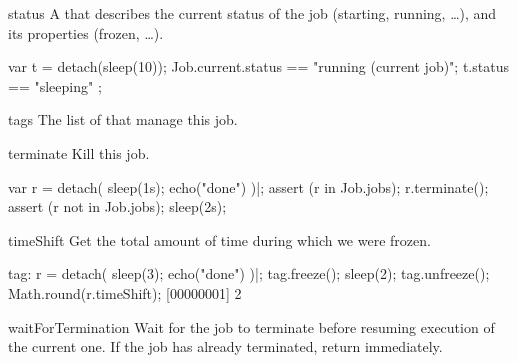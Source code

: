\begin{urbiscriptapi}
\item[status] A  that describes the current status of the
  job (starting, running, \ldots), and its properties (frozen, \ldots).
\begin{urbiassert}
var t = detach(sleep(10));
Job.current.status == "running (current job)";
t.status == "sleeping" ;
\end{urbiassert}


\item[tags] The list of  that manage this job.


\item[terminate]  Kill this job.
\begin{urbiscript}
var r = detach({ sleep(1s); echo("done") })|;
assert (r in Job.jobs);
r.terminate();
assert (r not in Job.jobs);
sleep(2s);
\end{urbiscript}


\item[timeShift]
  Get the total amount of time during which we were frozen.
\begin{urbiscript}
tag: r = detach({ sleep(3); echo("done") })|;
tag.freeze();
sleep(2);
tag.unfreeze();
Math.round(r.timeShift);
[00000001] 2
\end{urbiscript}


\item[waitForTermination] Wait for the job to terminate before resuming
  execution of the current one.  If the job has already terminated, return
  immediately.
\end{urbiscriptapi}



